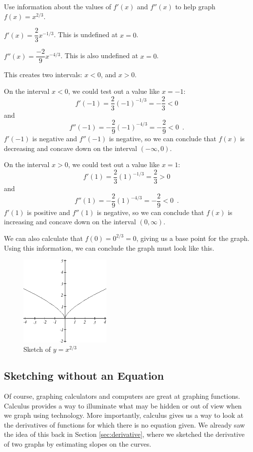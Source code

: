 \begin{example}
Use information about the values of $f'(x)$ and $f''(x)$ to help graph $f(x)=x^{2/3}$.

\begin{solution} $f'(x)=\dfrac{2}{3}x^{-1/3}$. This is undefined at $x=0$.

$f''(x)=\dfrac{-2}{9}x^{-4/3}$. This is also undefined at $x=0$.

This creates two intervals: $x<0$, and $x>0$.

On the interval $x<0$, we could test out a value like $x=-1$:
$$f'(-1)=\dfrac{2}{3}(-1)^{-1/3}=-\dfrac{2}{3}<0$$
and
$$f''(-1)=-\dfrac{2}{9}(-1)^{-4/3}=-\dfrac{2}{9}<0 \enspace .$$
$f'(-1)$ is negative and $f''(-1)$ is negative, so we can conclude that $f(x)$ is decreasing and concave down on the interval $(-\infty, 0)$.

On the interval $x>0$, we could test out a value like $x=1$:
$$f'(1)=\dfrac{2}{3}(1)^{-1/3}=\dfrac{2}{3} > 0$$
and
$$f''(1)=-\dfrac{2}{9}(1)^{-4/3}=-\dfrac{2}{9} < 0 \enspace .$$
$f'(1)$ is positive and $f''(1)$ is negative, so we can conclude that $f(x)$ is increasing and concave down on the interval $(0, \infty)$.

We can also calculate that $f(0)=0^{2/3} = 0$, giving us a base point for the graph. Using this information, we can conclude the graph must look like this.

\begin{figure}[!ht]
  \centering
    \includegraphics[width=0.4\textwidth]{img/chap3/image077.png}
    \caption{Sketch of $y=x^{2/3}$}
    \label{fig:3-5-ex5}
\end{figure}
\end{solution}\end{example}

\subsection{Sketching without an Equation}
Of course, graphing calculators and computers are great at graphing functions. Calculus provides a way to illuminate what may be hidden or out of view when we graph using technology. More importantly, calculus gives us a way to look at the derivatives of functions for which there is no equation given. We already saw the idea of this back in Section \ref{sec:derivative}, where we sketched the derivative of two graphs by estimating slopes on the curves.

